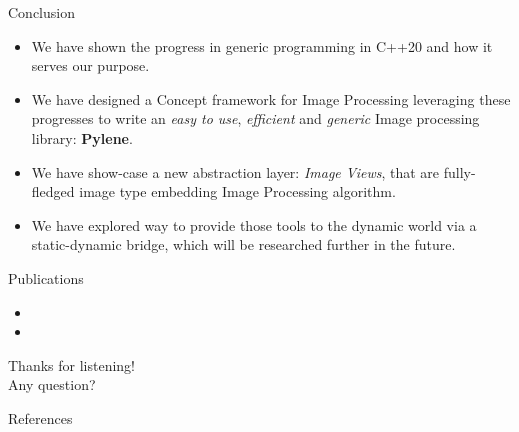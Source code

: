 \documentclass[12pt,aspectratio=169]{beamer}
\newcommand{\themename}{\textbf{\textsc{metropolis}}\xspace}
\begin{document}
\begin{frame}{Conclusion}
  \begin{itemize}
    \item We have shown the progress in generic programming in C++20 and how it serves our purpose.
    \item We have designed a Concept framework for Image Processing leveraging these progresses to write an \emph{easy to
            use}, \emph{efficient} and \emph{generic} Image processing library: \textbf{Pylene}.
    \item We have show-case a new abstraction layer: \emph{Image Views}, that are fully-fledged image type embedding Image
          Processing algorithm.
    \item We have explored way to provide those tools to the dynamic world via a static-dynamic bridge, which will be
          researched further in the future.
  \end{itemize}
\end{frame}

\begin{frame}[allowframebreaks]{Publications}
  \footnotesize
  \begin{itemize}
    \item {}
    \item {}
  \end{itemize}
\end{frame}

{
\begin{frame}[standout]
  Thanks for listening!\\
  Any question?
\end{frame}
}

\maketitle

\appendix

\begin{frame}[allowframebreaks]{References}
  \AtNextBibliography{\footnotesize}
  \printbibliography[heading=none]
\end{frame}

%
%
\end{document}
